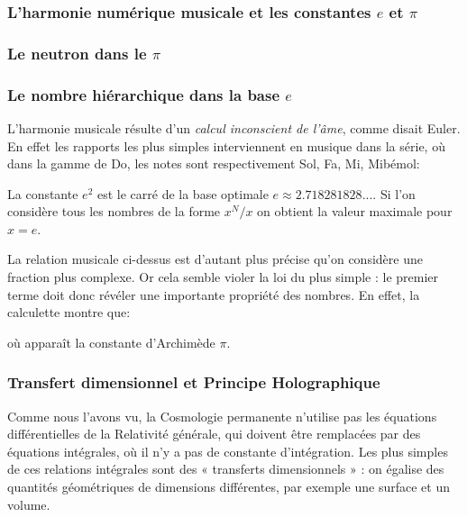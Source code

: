 \documentclass[a4paper,12pt]{article}
\begin{document}
\subsubsection{L'harmonie numérique musicale et les constantes $e$ et $\pi$}

\subsubsection{Le neutron dans le $\pi$}

\subsubsection{Le nombre hiérarchique dans la base $e$}


L'harmonie musicale résulte d'un \textit{calcul inconscient de l'âme}, comme disait Euler. En effet les rapports les plus simples interviennent en musique dans la série, où dans la gamme de Do, les notes sont respectivement Sol, Fa, Mi, Mibémol:




La constante $e^2$ est le carré de la base optimale $e \approx 2.718281828... $. Si l'on considère tous les nombres de la forme $x^N/x$ on obtient la valeur maximale pour $x = e$.


La relation musicale ci-dessus est d'autant plus précise qu'on considère une fraction plus complexe. Or cela semble violer la loi du plus simple : le premier terme doit donc révéler une importante propriété des nombres. En effet, la calculette montre que:





où appara\^it la constante d'Archimède $\pi$.



\subsubsection{Transfert dimensionnel et Principe Holographique }
 
Comme nous l'avons vu, la Cosmologie permanente n'utilise pas les équations différentielles de la Relativité générale, qui doivent être remplacées par des équations intégrales, où il n'y a pas de constante d'intégration. Les plus simples de ces relations intégrales sont des « transferts dimensionnels » : on égalise des quantités géométriques de dimensions différentes, par exemple une surface et un volume.
\end{document}
